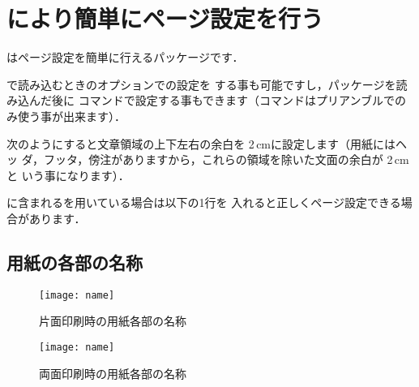 \section{により簡単にページ設定を行う}
%
%

はページ設定を簡単に行えるパッケージです．
\begin{usage}
 \usepackage[$\<ページ設定>$]{geometry}
 \geometry{$\<ページ設定>$}
\end{usage}
で読み込むときのオプションでの設定を
する事も可能ですし，パッケージを読み込んだ後に 
コマンドで設定する事もできます（コマンドはプリアンブルでの
み使う事が出来ます）．

次のようにすると文章領域の上下左右の余白を 2\,cmに設定します（用紙にはヘッ
ダ，フッタ，傍注がありますから，これらの領域を除いた文面の余白が 2\,cmと
いう事になります）．
\begin{intext}
\usepackage[margin=2cm]{geometry} 
\end{intext}

に含まれるを用いている場合は以下の1行を
入れると正しくページ設定できる場合があります．
\begin{intext}
\setlength\fullwidth{\textwidth}
\end{intext}

\subsection{用紙の各部の名称}

\begin{figure}[htbp]
 \begin{center}
  \texttt{[image: name]}
  \caption{片面印刷時の用紙各部の名称}
 \end{center}
\end{figure}

\begin{figure}[htbp]
 \begin{center}
  \texttt{[image: name]}
  \caption{両面印刷時の用紙各部の名称}
 \end{center}
\end{figure}




